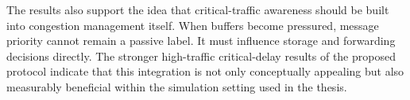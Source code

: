 The results also support the idea that critical-traffic awareness should be built into congestion management itself. When buffers become pressured, message priority cannot remain a passive label. It must influence storage and forwarding decisions directly. The stronger high-traffic critical-delay results of the proposed protocol indicate that this integration is not only conceptually appealing but also measurably beneficial within the simulation setting used in the thesis.
